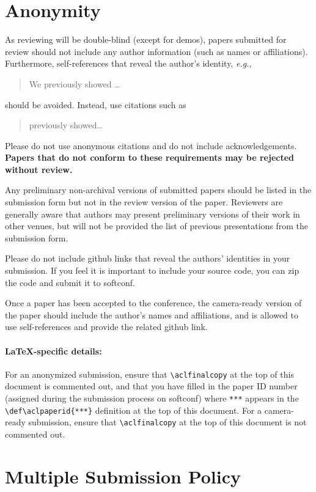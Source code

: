 \documentclass[11pt,a4paper]{article}
\begin{document}
\section{Anonymity}
As reviewing will be double-blind (except for demos), papers submitted for review should not include any author information (such as names or affiliations). Furthermore, self-references that reveal the author's identity, \emph{e.g.},
\begin{quote}
We previously showed \citep{Gusfield:97} \ldots
\end{quote}
should be avoided. Instead, use citations such as 
\begin{quote}
\citet{Gusfield:97} previously showed\ldots
\end{quote}
Please do not use anonymous citations and do not include acknowledgements.
\textbf{Papers that do not conform to these requirements may be rejected without review.}

Any preliminary non-archival versions of submitted papers should be listed in the submission form but not in the review version of the paper.
Reviewers are generally aware that authors may present preliminary versions of their work in other venues, but will not be provided the list of previous presentations from the submission form. 

Please do not include github links that reveal the authors' identities in your submission. If you feel it is important to include your source code, you can zip the code and submit it to softconf. 

Once a paper has been accepted to the conference, the camera-ready version of the paper should include the author's names and affiliations, and is allowed to use self-references and provide the related github link.


\paragraph{\LaTeX-specific details:}
For an anonymized submission, ensure that {\small\verb|\aclfinalcopy|} at the top of this document is commented out, and that you have filled in the paper ID number (assigned during the submission process on softconf) where {\small\verb|***|} appears in the {\small\verb|\def\aclpaperid{***}|} definition at the top of this document.
For a camera-ready submission, ensure that {\small\verb|\aclfinalcopy|} at the top of this document is not commented out.


\section{Multiple Submission Policy}
\end{document}
